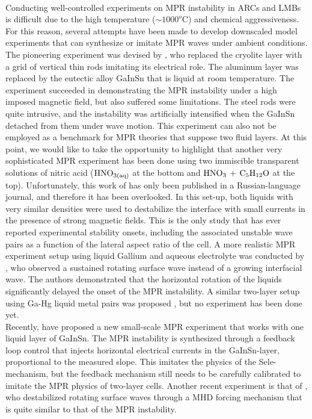 \documentclass[aps,prfluids,reprint,superscriptaddress]{revtex4-2}
\begin{document}
\\
\indent Conducting well-controlled experiments on MPR instability in ARCs and LMBs is difficult due to the high temperature ($\sim 1000^o$C) and chemical aggressiveness. For this reason, several attempts have been made to develop downscaled model experiments that can synthesize or imitate MPR waves under ambient conditions. The pioneering experiment was devised by \citet{Pedcenko2009,Pedcenko2017}, who replaced the cryolite layer with a grid of vertical thin rods imitating its electrical role. The aluminum layer was replaced by the eutectic alloy GaInSn that is liquid at room temperature. The experiment succeeded in demonstrating the MPR instability under a high imposed magnetic field, but also suffered some limitations. The steel rods were quite intrusive, and the instability was artificially intensified when the GaInSn detached from them  under wave motion. This experiment can also not be employed as a benchmark for MPR theories that suppose two fluid layers. At this point, we would like to take the opportunity to highlight that  another very sophisticated MPR experiment has been done using two immiscible transparent solutions of nitric acid ($\rm{HNO}_{\rm{3(aq)}}$ at the bottom and $\rm{HNO}_{3}$ + ${\rm C}_5\rm{H}_{12}\rm{O}$ at the top). Unfortunately, this work of \citet{Borisov2010} has only been published in a Russian-language journal, and therefore it has been overlooked.  In this set-up, both liquids with very similar densities were used to destabilize the interface with small currents in the presence of strong magnetic fields. This is the only study that has ever reported experimental stability onsets, including the associated unstable wave pairs as a function of the lateral aspect ratio of the cell. A more realistic MPR experiment setup using liquid Gallium and aqueous electrolyte was conducted by \citet{Grants2021}, who observed a sustained rotating surface wave instead of a growing interfacial wave. The authors demonstrated that the horizontal rotation of the liquids significantly delayed the onset of the MPR instability. A similar two-layer setup using Ga-Hg liquid metal pairs was proposed \cite{Nore2021}, but no experiment has been done yet.  
\\
\indent Recently, \citet{Hegde2025} have proposed a new small-scale MPR experiment that works with one liquid layer of GaInSn. The MPR instability is synthesized through a feedback loop control that injects horizontal electrical currents  in the GaInSn-layer, proportional to the measured slope. This imitates the physics of the Sele-mechanism, but the feedback mechanism still needs to be carefully calibrated to imitate the MPR physics of two-layer cells. Another recent experiment is that of \citet{Eltishchev2022,Eltishchev2024}, who destabilized rotating surface waves through a MHD forcing mechanism that is quite similar to that of the MPR instability.
\end{document}
